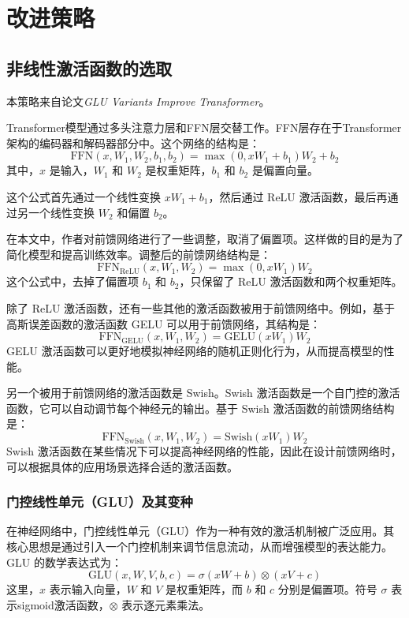 \section{改进策略}\label{sec-4}
\subsection{非线性激活函数的选取}\label{sec-4:nonlinear-activation}
本策略来自论文\textit{GLU Variants Improve Transformer}\citep{shazeerGLUVariantsImprove2020}。

Transformer模型通过多头注意力层和FFN层交替工作。FFN层存在于Transformer架构的编码器和解码器部分中。这个网络的结构是：
    $$
    \text{FFN}(x, W_1, W_2, b_1, b_2) = \max(0, xW_1 + b_1)W_2 + b_2
    $$
    其中，$ x $ 是输入，$ W_1 $ 和 $ W_2 $ 是权重矩阵，$ b_1 $ 和 $ b_2 $ 是偏置向量。
    
    这个公式首先通过一个线性变换 $ xW_1 + b_1 $，然后通过 ReLU 激活函数，最后再通过另一个线性变换 $ W_2 $ 和偏置 $ b_2 $。
    
    在本文中，作者对前馈网络进行了一些调整，取消了偏置项。这样做的目的是为了简化模型和提高训练效率。调整后的前馈网络结构是：
    $$
    \text{FFN}_{\text{ReLU}}(x, W_1, W_2) = \max(0, xW_1)W_2
    $$
    这个公式中，去掉了偏置项 $ b_1 $ 和 $ b_2 $，只保留了 ReLU 激活函数和两个权重矩阵。
    
    除了 ReLU 激活函数，还有一些其他的激活函数被用于前馈网络中。例如，基于高斯误差函数的激活函数 GELU 可以用于前馈网络，其结构是：
    $$
    \text{FFN}_{\text{GELU}}(x, W_1, W_2) = \text{GELU}(xW_1)W_2
    $$
    GELU 激活函数可以更好地模拟神经网络的随机正则化行为，从而提高模型的性能。
    
    另一个被用于前馈网络的激活函数是 Swish。Swish 激活函数是一个自门控的激活函数，它可以自动调节每个神经元的输出。基于 Swish 激活函数的前馈网络结构是：
    $$
    \text{FFN}_{\text{Swish}}(x, W_1, W_2) = \text{Swish}(xW_1)W_2
    $$
    Swish 激活函数在某些情况下可以提高神经网络的性能，因此在设计前馈网络时，可以根据具体的应用场景选择合适的激活函数。
\subsubsection{门控线性单元（GLU）及其变种}
    在神经网络中，门控线性单元（GLU）作为一种有效的激活机制被广泛应用。其核心思想是通过引入一个门控机制来调节信息流动，从而增强模型的表达能力。GLU 的数学表达式为：
    $$
    \text{GLU}(x, W, V, b, c) = \sigma(xW + b) \otimes (xV + c)
    $$
    这里，$ x $ 表示输入向量，$ W $ 和 $ V $ 是权重矩阵，而 $ b $ 和 $ c $ 分别是偏置项。符号 $ \sigma $ 表示sigmoid激活函数，$ \otimes $ 表示逐元素乘法。
    
